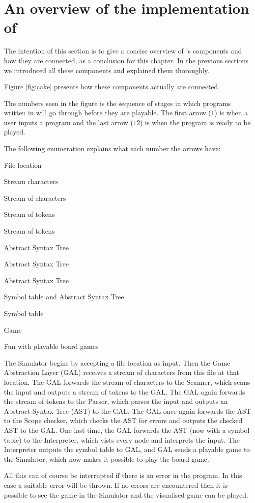 \section{An overview of the implementation of \productname{}}
\label{anoverviewofjunta}

The intention of this section is to give a concise overview of \productname{}'s
components and how they are connected, as a conclusion for this chapter. In the
previous sections we introduced all these components and explained them
thoroughly.

Figure \ref{fig:cake} presents how these components actually are connected.



The numbers seen in the figure is the sequence of stages in which programs 
written in \productname{} will go through before they are playable. The first
arrow ($1$) is when a user inputs a program and the last arrow ($12$) is when
the program is ready to be played.

The following enumeration explains what each number the arrows have:

\begin{nlist}
\item File location
\item Stream characters
\item Stream of characters
\item Stream of tokens
\item Stream of tokens
\item Abstract Syntax Tree
\item Abstract Syntax Tree
\item Abstract Syntax Tree
\item Symbol table and Abstract Syntax Tree
\item Symbol table
\item Game
\item Fun with playable board games
\end{nlist}

The Simulator begins by accepting a file location as input. Then the Game
Abstraction Layer (GAL) receives a stream of characters from this file at that
location. The GAL forwards the stream of characters to the Scanner, which scans
the input and outputs a stream of tokens to the GAL. The GAL again forwards the
stream of tokens to the Parser, which parses the input and outputs an Abstract
Syntax Tree (AST) to the GAL. The GAL once again forwards the AST to the Scope
checker, which checks the AST for errors and outputs the checked AST to the GAL.
One last time, the GAL forwards the AST (now with a symbol table) to the 
Interpreter, which vists every node and interprets the input. The Interpreter
outputs the symbol table to GAL, and GAL sends a playable game to the Simulator,
which now makes it possible to play the board game.

All this can of course be interrupted if there is an error in the program. In
this case a suitable error will be thrown. If no errors are encountered then it
is possible to see the game in the Simulator and the visualised game can be played.
